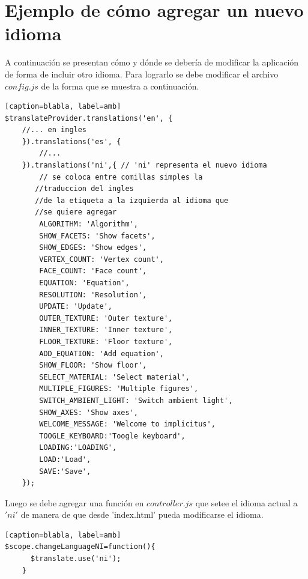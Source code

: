 \documentclass[12pt]{article}
\begin{document}
\section{Ejemplo de cómo agregar un nuevo idioma}
A continuación se presentan cómo y dónde se debería de modificar la aplicación de forma de incluir otro idioma. 
Para lograrlo se debe modificar el archivo $config.js$ de la forma que se muestra a continuación.
\begin{lstlisting}[frame=single][caption=blabla, label=amb]
$translateProvider.translations('en', {
   	//... en ingles  
    }).translations('es', {
        //...                 
    }).translations('ni',{ // 'ni' representa el nuevo idioma
        // se coloca entre comillas simples la 
       //traduccion del ingles 
       //de la etiqueta a la izquierda al idioma que 
       //se quiere agregar
        ALGORITHM: 'Algorithm', 
        SHOW_FACETS: 'Show facets',
        SHOW_EDGES: 'Show edges',
        VERTEX_COUNT: 'Vertex count',
        FACE_COUNT: 'Face count',
        EQUATION: 'Equation',
        RESOLUTION: 'Resolution',
        UPDATE: 'Update',
        OUTER_TEXTURE: 'Outer texture',
        INNER_TEXTURE: 'Inner texture',
        FLOOR_TEXTURE: 'Floor texture',
        ADD_EQUATION: 'Add equation',
        SHOW_FLOOR: 'Show floor',
        SELECT_MATERIAL: 'Select material',
        MULTIPLE_FIGURES: 'Multiple figures',
        SWITCH_AMBIENT_LIGHT: 'Switch ambient light',
        SHOW_AXES: 'Show axes',
        WELCOME_MESSAGE: 'Welcome to implicitus',
        TOOGLE_KEYBOARD:'Toogle keyboard',
        LOADING:'LOADING',
        LOAD:'Load',
        SAVE:'Save', 
    });
\end{lstlisting}
Luego se debe agregar una función en $controller.js$ que setee el idioma actual a $'ni'$ de manera de que desde 'index.html' pueda modificarse el idioma.
\begin{lstlisting}[frame=single][caption=blabla, label=amb]
$scope.changeLanguageNI=function(){
      $translate.use('ni');
    }
\end{lstlisting}
\clearpage
\end{document}
